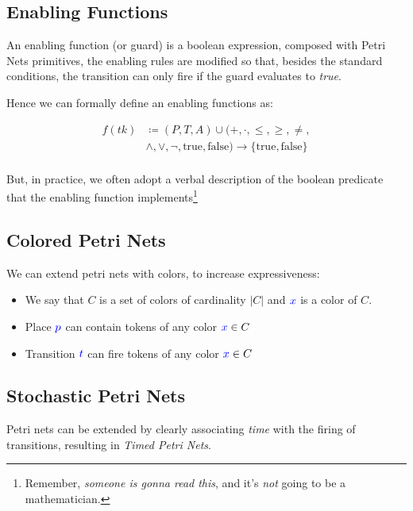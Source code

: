 \documentclass[openright, twoside, twocolumn]{report}
\begin{document}
    \subsection{Enabling Functions}

    An enabling function (or guard) is a boolean expression, composed with Petri Nets primitives, the enabling rules
    are modified so that, besides the standard conditions, the transition can only fire if the guard evaluates to
    \emph{true}.

    Hence we can formally define an enabling functions as:

\begin{align*}
  f(tk) &\coloneqq (P, T, A) \cup (+, \cdot, \leq, \geq, \neq, \\
  & \land, \lor, \neg, \text{true}, \text{false}) \to \{ \text{true}, \text{false} \}\\
\end{align*}

But, in practice, we often adopt a verbal description of the boolean predicate that the enabling function implements\footnote{%
  Remember, \emph{someone is gonna read this}, and it's \emph{not} going to be a mathematician.
}

  \subsection{Colored Petri Nets}

  We can extend petri nets with colors, to increase expressiveness:

  \begin{itemize}
    \item We say that $C$ is a set of colors of cardinality $|C|$ and $\textcolor{blue}{x}$ is a color of $C$.
    \item Place $\textcolor{blue}{p}$ can contain tokens of any color $\textcolor{blue}{x} \in  C $
    \item Transition $\textcolor{blue}{t}$ can fire tokens of any color $\textcolor{blue}{x} \in C$
  \end{itemize}

  \subsection{Stochastic Petri Nets}

  Petri nets can be extended by clearly associating \emph{time} with the firing of transitions,
  resulting in \emph{Timed Petri Nets}.
\end{document}
